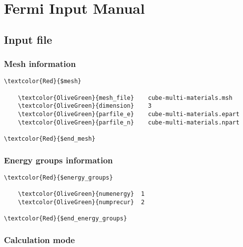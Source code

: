\chapter*{Fermi Input Manual}





\section{Input file}

\subsection{Mesh information}

\begin{Verbatim}[frame=single,commandchars=\\\{\}]
\textcolor{Red}{$mesh}

    \textcolor{OliveGreen}{mesh_file}    cube-multi-materials.msh
    \textcolor{OliveGreen}{dimension}    3
    \textcolor{OliveGreen}{parfile_e}    cube-multi-materials.epart
    \textcolor{OliveGreen}{parfile_n}    cube-multi-materials.npart

\textcolor{Red}{$end_mesh} 
\end{Verbatim}


\subsection{Energy groups information}

\begin{Verbatim}[frame=single,commandchars=\\\{\}]
\textcolor{Red}{$energy_groups}

    \textcolor{OliveGreen}{numenergy}  1
    \textcolor{OliveGreen}{numprecur}  2
    
\textcolor{Red}{$end_energy_groups}
\end{Verbatim}



\subsection{Calculation mode}

